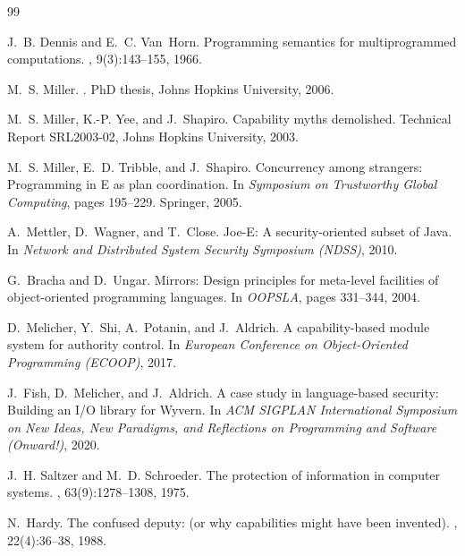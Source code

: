 \documentclass[11pt,a4paper]{article}
\begin{document}

\begin{thebibliography}{99}

J.~B. Dennis and E.~C. Van~Horn. %
\newblock Programming semantics for multiprogrammed computations. %
, 9(3):143--155, 1966. %

M.~S. Miller. %
. %
\newblock PhD thesis, Johns Hopkins University, 2006. %

M.~S. Miller, K.-P. Yee, and J.~Shapiro. %
\newblock Capability myths demolished. %
\newblock Technical Report SRL2003-02, Johns Hopkins University, 2003. %

M.~S. Miller, E.~D. Tribble, and J.~Shapiro. %
\newblock Concurrency among strangers: Programming in {E} as plan coordination. %
\newblock In {\em Symposium on Trustworthy Global Computing}, pages 195--229. %
  Springer, 2005. %

A.~Mettler, D.~Wagner, and T.~Close. %
\newblock Joe-{E}: A security-oriented subset of {J}ava. %
\newblock In {\em Network and Distributed System Security Symposium (NDSS)},
  2010. %

G.~Bracha and D.~Ungar. %
\newblock Mirrors: Design principles for meta-level facilities of
  object-oriented programming languages. %
\newblock In {\em OOPSLA}, pages 331--344, 2004. %

D.~Melicher, Y.~Shi, A.~Potanin, and J.~Aldrich. %
\newblock A capability-based module system for authority control. %
\newblock In {\em European Conference on Object-Oriented Programming (ECOOP)},
  2017. %

J.~Fish, D.~Melicher, and J.~Aldrich. %
\newblock A case study in language-based security: Building an {I/O} library
  for {Wyvern}. %
\newblock In {\em ACM SIGPLAN International Symposium on New Ideas, New
  Paradigms, and Reflections on Programming and Software (Onward!)}, 2020. %

J.~H. Saltzer and M.~D. Schroeder. %
\newblock The protection of information in computer systems. %
, 63(9):1278--1308, 1975. %

N.~Hardy. %
\newblock The confused deputy: (or why capabilities might have been invented). %
, 22(4):36--38, 1988. %


\end{thebibliography}
\end{document}
